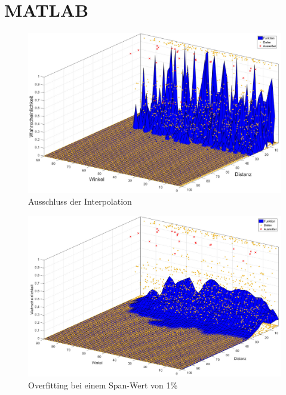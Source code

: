 \chapter{MATLAB}

\begin{figure}[H]
\centering
\includegraphics[scale=0.34]{se-wa-jpg/inter}
\caption{Ausschluss der Interpolation}
\label{inter}
\end{figure}

\begin{figure}[H]
\centering
\includegraphics[scale=0.34]{se-wa-jpg/splinewdTM}
\caption{Overfitting bei einem Span-Wert von 1\%}
\label{splinewdTM}
\end{figure}

